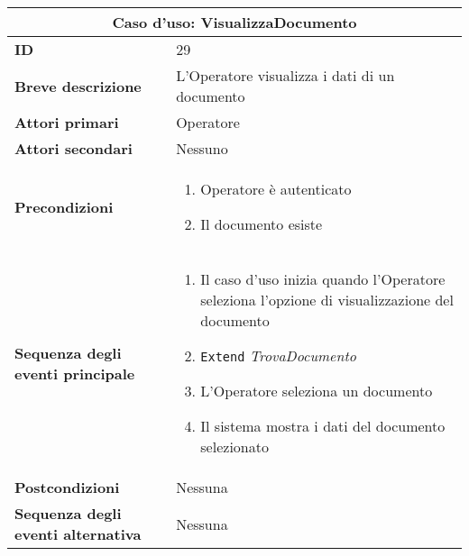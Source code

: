 \documentclass[a4paper]{report}
\begin{document}
\clearpage
\begin{table}[H]
\vspace*{-0cm}
\renewcommand{\arraystretch}{1.9}
\begin{tabular}{|p{3.9cm}|p{9.9cm}|}
\hline
\multicolumn{2}{|c|}{\textbf{Caso d’uso: VisualizzaDocumento}} \\ \hline
	\textbf{ID} & 29 \\ \hline
	\textbf{Breve descrizione} & L’Operatore visualizza i dati di un documento \\ \hline
	\textbf{Attori primari} & Operatore \\ \hline
	\textbf{Attori secondari} & Nessuno \\ \hline
	\textbf{Precondizioni} & \begin{enumerate}[leftmargin=14pt,label=\arabic*.,labelsep=0.5em,topsep=0pt,partopsep=0pt,parsep=0pt,itemsep=0pt]
        \item Operatore è autenticato
        \item Il documento esiste
    \end{enumerate} \\ \hline
	\textbf{Sequenza degli eventi principale} &
    \begin{enumerate}[leftmargin=14pt,label=\arabic*.,labelsep=0.5em,topsep=0pt,partopsep=0pt,parsep=0pt,itemsep=0pt]
        \item Il caso d’uso inizia quando l’Operatore seleziona l'opzione di visualizzazione del documento
        \item \texttt{Extend} \textit{TrovaDocumento}
        \item L'Operatore seleziona un documento
        \item Il sistema mostra i dati del documento selezionato
    \end{enumerate} \\ \hline
	\textbf{Postcondizioni} & Nessuna \\ \hline
	\textbf{Sequenza degli eventi alternativa} & Nessuna \\ \hline
\end{tabular}
\end{table}
\end{document}

